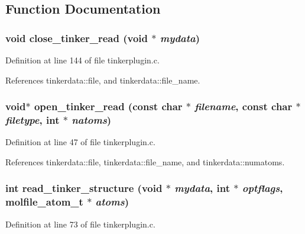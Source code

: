 \subsection{Function Documentation}
\subsubsection{\setlength{\rightskip}{0pt plus 5cm}void close\_\-tinker\_\-read (void $\ast$ {\em mydata})\hspace{0.3cm}{\tt  [static]}}\label{tinkerplugin_8c_a4}




Definition at line 144 of file tinkerplugin.c.

References tinkerdata::file, and tinkerdata::file\_\-name.
\subsubsection{\setlength{\rightskip}{0pt plus 5cm}void$\ast$ open\_\-tinker\_\-read (const char $\ast$ {\em filename}, const char $\ast$ {\em filetype}, int $\ast$ {\em natoms})\hspace{0.3cm}{\tt  [static]}}\label{tinkerplugin_8c_a1}




Definition at line 47 of file tinkerplugin.c.

References tinkerdata::file, tinkerdata::file\_\-name, and tinkerdata::numatoms.
\subsubsection{\setlength{\rightskip}{0pt plus 5cm}int read\_\-tinker\_\-structure (void $\ast$ {\em mydata}, int $\ast$ {\em optflags}, {\bf molfile\_\-atom\_\-t} $\ast$ {\em atoms})\hspace{0.3cm}{\tt  [static]}}\label{tinkerplugin_8c_a2}




Definition at line 73 of file tinkerplugin.c.

